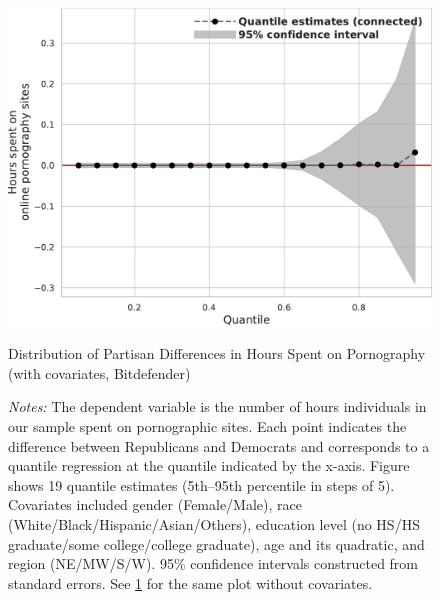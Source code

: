 \documentclass[12pt,twoside]{article}
\begin{document}
\begin{figure}[ht]
	\centering
	\includegraphics[width=.6\linewidth]{figs/bitdefender_quantile_reg_covariates_duration_adult.pdf}
	\caption{Distribution of Partisan Differences in Hours Spent on Pornography (with covariates, Bitdefender)}
	\caption*{\footnotesize \emph{Notes:} 
		The dependent variable is the number of hours individuals in our sample spent on pornographic sites.
		Each point indicates the difference between Republicans and Democrats and corresponds to a quantile regression at the quantile indicated by the x-axis.
  Figure shows 19 quantile estimates (5th--95th percentile in steps of 5).
		Covariates included gender (Female/Male), race (White/Black/Hispanic/Asian/Others), education level (no HS/HS graduate/some college/college graduate), age and its quadratic, and region (NE/MW/S/W).
		95\% confidence intervals constructed from standard errors.
		See \cref{fig:bitdefender_quantile_regression_duration_covariates} for the same plot without covariates.
	}
	\label{fig:bitdefender_quantile_regression_duration_covariates}
\end{figure}


\FloatBarrier
\clearpage
\end{document}
